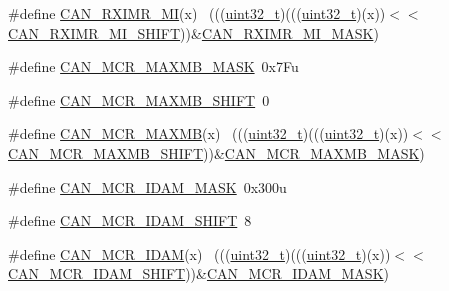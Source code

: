 \begin{DoxyCompactItemize}
\item 
\#define \hyperlink{group___c_a_n___register___masks_gab51c9bf30934a1eec4e00ac689d76540}{C\+A\+N\+\_\+\+R\+X\+I\+M\+R\+\_\+\+MI}(x)                                                ~(((\hyperlink{_p_e___types_8h_a33594304e786b158f3fb30289278f5af}{uint32\+\_\+t})(((\hyperlink{_p_e___types_8h_a33594304e786b158f3fb30289278f5af}{uint32\+\_\+t})(x))$<$$<$\hyperlink{group___c_a_n___register___masks_gae3dd7acc84e521ca0a05beb33f7b434c}{C\+A\+N\+\_\+\+R\+X\+I\+M\+R\+\_\+\+M\+I\+\_\+\+S\+H\+I\+FT}))\&\hyperlink{group___c_a_n___register___masks_ga3cef91282e43c8e5d2c30e65d375f964}{C\+A\+N\+\_\+\+R\+X\+I\+M\+R\+\_\+\+M\+I\+\_\+\+M\+A\+SK})
\item 
\#define \hyperlink{group___c_a_n___register___masks_ga86b59c74c0b9f310c3922c7c8c04dd03}{C\+A\+N\+\_\+\+M\+C\+R\+\_\+\+M\+A\+X\+M\+B\+\_\+\+M\+A\+SK}~0x7\+Fu
\item 
\#define \hyperlink{group___c_a_n___register___masks_ga0807275385d5041baeca3bb7ddb4bdf5}{C\+A\+N\+\_\+\+M\+C\+R\+\_\+\+M\+A\+X\+M\+B\+\_\+\+S\+H\+I\+FT}~0
\item 
\#define \hyperlink{group___c_a_n___register___masks_ga7d840ec6bea7287110c94cda3613bb7d}{C\+A\+N\+\_\+\+M\+C\+R\+\_\+\+M\+A\+X\+MB}(x)                                              ~(((\hyperlink{_p_e___types_8h_a33594304e786b158f3fb30289278f5af}{uint32\+\_\+t})(((\hyperlink{_p_e___types_8h_a33594304e786b158f3fb30289278f5af}{uint32\+\_\+t})(x))$<$$<$\hyperlink{group___c_a_n___register___masks_ga0807275385d5041baeca3bb7ddb4bdf5}{C\+A\+N\+\_\+\+M\+C\+R\+\_\+\+M\+A\+X\+M\+B\+\_\+\+S\+H\+I\+FT}))\&\hyperlink{group___c_a_n___register___masks_ga86b59c74c0b9f310c3922c7c8c04dd03}{C\+A\+N\+\_\+\+M\+C\+R\+\_\+\+M\+A\+X\+M\+B\+\_\+\+M\+A\+SK})
\item 
\#define \hyperlink{group___c_a_n___register___masks_ga758ccb033a3d823109f8bf4e23b46827}{C\+A\+N\+\_\+\+M\+C\+R\+\_\+\+I\+D\+A\+M\+\_\+\+M\+A\+SK}~0x300u
\item 
\#define \hyperlink{group___c_a_n___register___masks_gae76a75d680b0c33f41429f14132ee78f}{C\+A\+N\+\_\+\+M\+C\+R\+\_\+\+I\+D\+A\+M\+\_\+\+S\+H\+I\+FT}~8
\item 
\#define \hyperlink{group___c_a_n___register___masks_ga18ead0b4277d8ce2b1bd4fe80769c46f}{C\+A\+N\+\_\+\+M\+C\+R\+\_\+\+I\+D\+AM}(x)                                                ~(((\hyperlink{_p_e___types_8h_a33594304e786b158f3fb30289278f5af}{uint32\+\_\+t})(((\hyperlink{_p_e___types_8h_a33594304e786b158f3fb30289278f5af}{uint32\+\_\+t})(x))$<$$<$\hyperlink{group___c_a_n___register___masks_gae76a75d680b0c33f41429f14132ee78f}{C\+A\+N\+\_\+\+M\+C\+R\+\_\+\+I\+D\+A\+M\+\_\+\+S\+H\+I\+FT}))\&\hyperlink{group___c_a_n___register___masks_ga758ccb033a3d823109f8bf4e23b46827}{C\+A\+N\+\_\+\+M\+C\+R\+\_\+\+I\+D\+A\+M\+\_\+\+M\+A\+SK})
$$
\end{DoxyCompactItemize}
